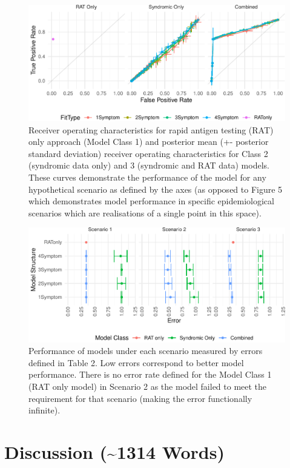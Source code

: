 \documentclass[]{elsarticle} %
\begin{document}
\begin{figure}
\centering
\includegraphics{0501_MainText_files/figure-latex/ROC-plot-1.pdf}
\caption{\label{fig:ROC-plot} Receiver operating characteristics for rapid antigen testing (RAT) only approach (Model Class 1) and posterior mean (+- posterior standard deviation) receiver operating characteristics for Class 2 (syndromic data only) and 3 (syndromic and RAT data) models. These curves demonstrate the performance of the model for any hypothetical scenario as defined by the axes (as opposed to Figure 5 which demonstrates model performance in specific epidemiological scenarios which are realisations of a single point in this space).}
\end{figure}

\begin{figure}
\centering
\includegraphics{0501_MainText_files/figure-latex/scenario-plot-1.pdf}
\caption{\label{fig:scenario-plot}Performance of models under each scenario measured by errors defined in Table 2. Low errors correspond to better model performance. There is no error rate defined for the Model Class 1 (RAT only model) in Scenario 2 as the model failed to meet the requirement for that scenario (making the error functionally infinite).}
\end{figure}

\hypertarget{discussion-1314-words}{%
\section{Discussion (\textasciitilde1314 Words)}\label{discussion-1314-words}}
\end{document}
